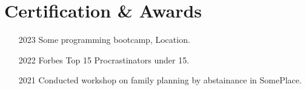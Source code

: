 \documentclass[10pt]{article}
\begin{document}
\section{Certification \& Awards}
\begin{enumerate}[itemsep=0pt]
  \item [2023] Some programming bootcamp, Location.
  \item [2022] Forbes Top 15 Procrastinators under 15.
  \item [2021] Conducted workshop on family planning by abstainance in SomePlace.
\end{enumerate}
\end{document}
